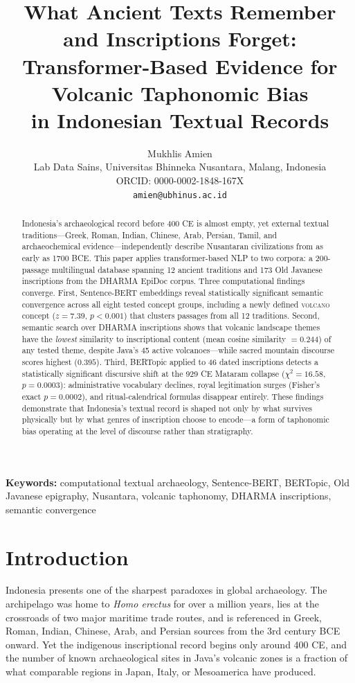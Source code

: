 \documentclass[12pt]{article}
\title{What Ancient Texts Remember and Inscriptions Forget:\\
Transformer-Based Evidence for Volcanic Taphonomic Bias\\in Indonesian Textual Records}
\author{Mukhlis Amien\\
\small Lab Data Sains, Universitas Bhinneka Nusantara, Malang, Indonesia\\
\small ORCID: 0000-0002-1848-167X\\
\small \texttt{amien@ubhinus.ac.id}}
\date{}
\begin{document}
\maketitle

\begin{abstract}
Indonesia's archaeological record before 400 CE is almost empty, yet external textual traditions---Greek, Roman, Indian, Chinese, Arab, Persian, Tamil, and archaeochemical evidence---independently describe Nusantaran civilizations from as early as 1700 BCE.
This paper applies transformer-based NLP to two corpora: a 200-passage multilingual database spanning 12 ancient traditions and 173 Old Javanese inscriptions from the DHARMA EpiDoc corpus.
Three computational findings converge.
First, Sentence-BERT embeddings reveal statistically significant semantic convergence across all eight tested concept groups, including a newly defined \textsc{volcano} concept ($z = 7.39$, $p < 0.001$) that clusters passages from all 12 traditions.
Second, semantic search over DHARMA inscriptions shows that volcanic landscape themes have the \emph{lowest} similarity to inscriptional content (mean cosine similarity $= 0.244$) of any tested theme, despite Java's 45 active volcanoes---while sacred mountain discourse scores highest ($0.395$).
Third, BERTopic applied to 46 dated inscriptions detects a statistically significant discursive shift at the 929 CE Mataram collapse ($\chi^2 = 16.58$, $p = 0.0003$): administrative vocabulary declines, royal legitimation surges (Fisher's exact $p = 0.0002$), and ritual-calendrical formulas disappear entirely.
These findings demonstrate that Indonesia's textual record is shaped not only by what survives physically but by what genres of inscription choose to encode---a form of taphonomic bias operating at the level of discourse rather than stratigraphy.
\end{abstract}

\noindent\textbf{Keywords:} computational textual archaeology, Sentence-BERT, BERTopic, Old Javanese epigraphy, Nusantara, volcanic taphonomy, DHARMA inscriptions, semantic convergence

\section{Introduction}

Indonesia presents one of the sharpest paradoxes in global archaeology.
The archipelago was home to \textit{Homo erectus} for over a million years, lies at the crossroads of two major maritime trade routes, and is referenced in Greek, Roman, Indian, Chinese, Arab, and Persian sources from the 3rd century BCE onward.
Yet the indigenous inscriptional record begins only around 400 CE, and the number of known archaeological sites in Java's volcanic zones is a fraction of what comparable regions in Japan, Italy, or Mesoamerica have produced.
\end{document}
